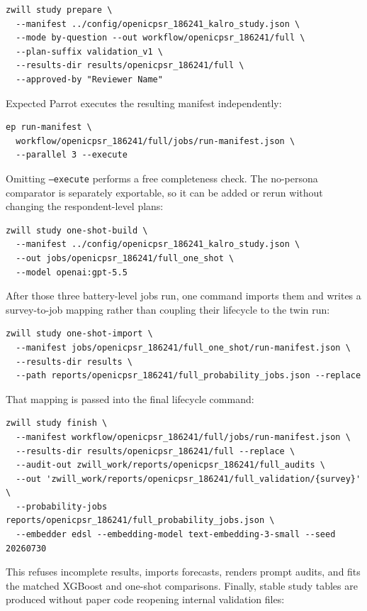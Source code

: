 \documentclass[11pt]{article}
\begin{document}
\begin{lstlisting}[style=shell]
zwill study prepare \
  --manifest ../config/openicpsr_186241_kalro_study.json \
  --mode by-question --out workflow/openicpsr_186241/full \
  --plan-suffix validation_v1 \
  --results-dir results/openicpsr_186241/full \
  --approved-by "Reviewer Name"
\end{lstlisting}
Expected Parrot executes the resulting manifest independently:

\begin{lstlisting}[style=shell]
ep run-manifest \
  workflow/openicpsr_186241/full/jobs/run-manifest.json \
  --parallel 3 --execute
\end{lstlisting}
Omitting \texttt{--execute} performs a free completeness check. The no-persona
comparator is separately exportable, so it can be added or rerun without
changing the respondent-level plans:

\begin{lstlisting}[style=shell]
zwill study one-shot-build \
  --manifest ../config/openicpsr_186241_kalro_study.json \
  --out jobs/openicpsr_186241/full_one_shot \
  --model openai:gpt-5.5
\end{lstlisting}
After those three battery-level jobs run, one command imports them and writes a
survey-to-job mapping rather than coupling their lifecycle to the twin run:

\begin{lstlisting}[style=shell]
zwill study one-shot-import \
  --manifest jobs/openicpsr_186241/full_one_shot/run-manifest.json \
  --results-dir results \
  --path reports/openicpsr_186241/full_probability_jobs.json --replace
\end{lstlisting}
\newpage
That mapping is passed into the final lifecycle command:

\begin{lstlisting}[style=shell]
zwill study finish \
  --manifest workflow/openicpsr_186241/full/jobs/run-manifest.json \
  --results-dir results/openicpsr_186241/full --replace \
  --audit-out zwill_work/reports/openicpsr_186241/full_audits \
  --out 'zwill_work/reports/openicpsr_186241/full_validation/{survey}' \
  --probability-jobs reports/openicpsr_186241/full_probability_jobs.json \
  --embedder edsl --embedding-model text-embedding-3-small --seed 20260730
\end{lstlisting}
This refuses incomplete results, imports forecasts, renders prompt audits, and
fits the matched XGBoost and one-shot comparisons. Finally, stable study tables
are produced without paper code reopening internal validation files:
\end{document}
